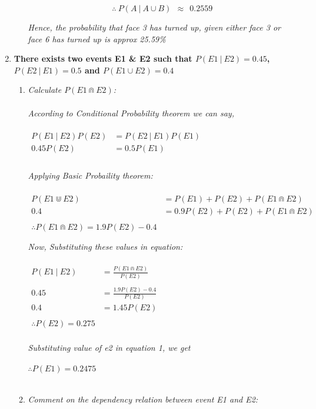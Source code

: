 \documentclass{article}
\begin{document}
\begin{enumerate}
\begin{enumerate}
        \[
          \boxed{\therefore\ P(A \ |\ A \cup B)\ \ \approx \ \ 0.2559}
        \]
        
        \textit{Hence, the probability that face 3 has turned up, given either face 3 or face 6 has turned up is approx 25.59\%}
\end{enumerate}
\newpage
\item \textbf{There exists two events E1 \& E2 such that $P(E1 \ |\ E2) = 0.45$, $P(E2 \ |\ E1) = 0.5$ and $P(E1 \cup E2) = 0.4$}
  \begin{enumerate}
    \item\textit{Calculate $P(E1 \Cap E2)$:}\\\\
    \textit{According to Conditional Probability theorem we can say,}\\\\
    $\begin{aligned}
      P(E1 \ |\ E2)P(E2) & = P(E2 \ |\ E1)P(E1)\\
      0.45P(E2) & = 0.5P(E1) \\
    \end{aligned}$\\\\
    \textit{Applying Basic Probaility theorem:}\\\\
    $\begin{aligned}
      P(E1 \Cup E2) & = P(E1) + P(E2) + P(E1 \Cap E2)\\
      0.4 & = 0.9P(E2) + P(E2) + P(E1 \Cap E2)\\\\
      \therefore P(E1 \Cap E2) = 1.9P(E2) - 0.4\\\\
    \end{aligned}$\\
    \textit{Now, Substituting these values in equation:}\\\\
    $\begin{aligned}
      P(E1 \ |\ E2) & = \frac{P(E1 \Cap E2)}{P(E2)}\\\\
      0.45 & = \frac{1.9P(E2) - 0.4}{P(E2)}\\
      0.4 & = 1.45P(E2)\\\\
      \therefore P(E2) = 0.275
    \end{aligned}$\\\\
    \textit{Substituting value of e2 in equation 1, we get}\\\\
    $\therefore P(E1) = 0.2475$\\\\
    \item \textit{ Comment on the dependency relation between event E1 and E2:}
    

\end{enumerate}
\end{enumerate}
\end{document}
